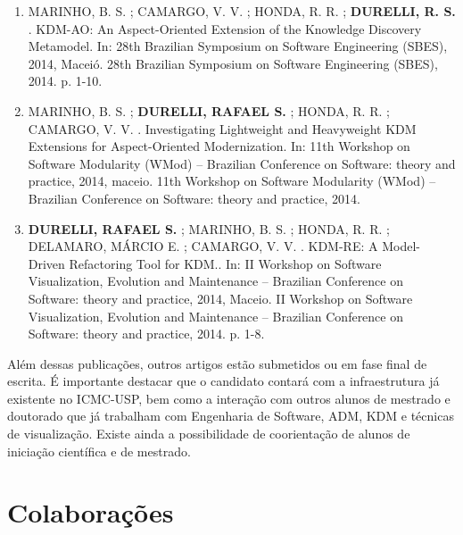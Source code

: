 \documentclass[12pt]{article}
\begin{document}
\begin{itemize}
\begin{enumerate}
		\item MARINHO, B. S. ; CAMARGO, V. V. ; HONDA, R. R. ; \textbf{DURELLI, R. S.} . KDM-AO: An Aspect-Oriented Extension of the Knowledge Discovery Metamodel. In: 28th Brazilian Symposium on Software Engineering (SBES), 2014, Maceió. 28th Brazilian Symposium on Software Engineering (SBES), 2014. p. 1-10.
		
		\item MARINHO, B. S. ; \textbf{DURELLI, RAFAEL S.} ; HONDA, R. R. ; CAMARGO, V. V. . Investigating Lightweight and Heavyweight KDM Extensions for Aspect-Oriented Modernization. In: 11th Workshop on Software Modularity (WMod) -- Brazilian Conference on Software: theory and practice, 2014, maceio. 11th Workshop on Software Modularity (WMod) -- Brazilian Conference on Software: theory and practice, 2014.
		
		\item \textbf{DURELLI, RAFAEL S.} ; MARINHO, B. S. ; HONDA, R. R. ; DELAMARO, MÁRCIO E. ; CAMARGO, V. V. . KDM-RE: A Model-Driven Refactoring Tool for KDM.. In: II Workshop on Software Visualization, Evolution and Maintenance -- Brazilian Conference on Software: theory and practice, 2014, Maceio. II Workshop on Software Visualization, Evolution and Maintenance -- Brazilian Conference on Software: theory and practice, 2014. p. 1-8.

\end{enumerate}
\end{itemize}

Além dessas publicações, outros artigos estão submetidos ou em fase final de escrita. É importante destacar que o candidato contará com a infraestrutura já existente no ICMC-USP, bem como a interação com outros alunos de mestrado e doutorado que já trabalham com Engenharia de Software, ADM, KDM e técnicas de visualização. Existe ainda a possibilidade de coorientação de alunos de iniciação científica e de mestrado.

\section{Colaborações}\label{sec:colaboracoes}
\end{document}
